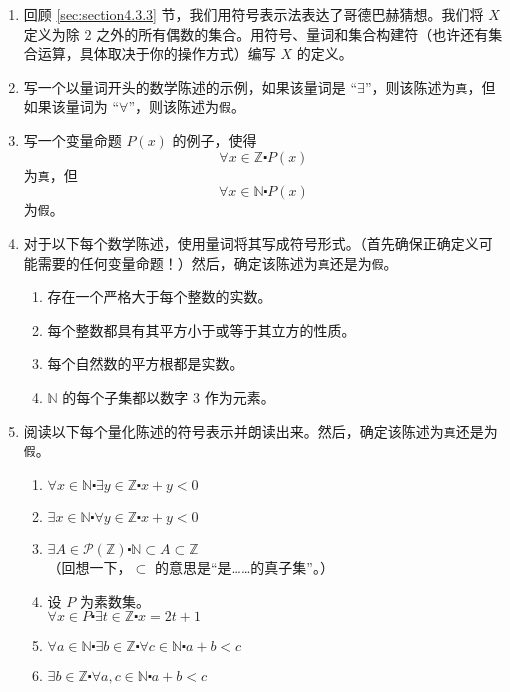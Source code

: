 \begin{enumerate}[label=(\arabic*)]
    \item 回顾 \ref{sec:section4.3.3} 节，我们用符号表示法表达了哥德巴赫猜想。我们将 $X$ 定义为除 $2$ 之外的所有偶数的集合。用符号、量词和集合构建符（也许还有集合运算，具体取决于你的操作方式）编写 $X$ 的定义。
    \item 写一个以量词开头的数学陈述的示例，如果该量词是 ``$\exists$''，则该陈述为\verb|真|，但如果该量词为  ``$\forall$''，则该陈述为\verb|假|。
    \item 写一个变量命题 $P(x)$ 的例子，使得
        \[\forall x \in \mathbb{Z} \centerdot P(x)\]
        为\verb|真|，但
        \[\forall x \in \mathbb{N} \centerdot P(x)\]
        为\verb|假|。
    \item 对于以下每个数学陈述，使用量词将其写成符号形式。（首先确保正确定义可能需要的任何变量命题！）然后，确定该陈述为\verb|真|还是为\verb|假|。
        \begin{enumerate}[label=(\alph*)]
            \item 存在一个严格大于每个整数的实数。
            \item 每个整数都具有其平方小于或等于其立方的性质。
            \item 每个自然数的平方根都是实数。
            \item $\mathbb{N}$ 的每个子集都以数字 $3$ 作为元素。
        \end{enumerate} 
    \item 阅读以下每个量化陈述的符号表示并朗读出来。然后，确定该陈述为\verb|真|还是为\verb|假|。
        \begin{enumerate}[label=(\alph*)]
            \item $\forall x \in \mathbb{N} \centerdot \exists y \in \mathbb{Z} \centerdot x + y < 0$
            \item $\exists x \in \mathbb{N} \centerdot \forall y \in \mathbb{Z} \centerdot x + y < 0$
            \item $\exists A \in \mathcal{P}(\mathbb{Z}) \centerdot \mathbb{N} \subset A \subset \mathbb{Z}$\\（回想一下，$⊂$ 的意思是``是……的真子集''。）
            \item 设 $P$ 为素数集。\\
                    $\forall x \in P \centerdot \exists t \in \mathbb{Z} \centerdot x = 2t + 1$
            \item $\forall a \in \mathbb{N} \centerdot \exists b \in \mathbb{Z} \centerdot \forall c \in \mathbb{N} \centerdot a + b < c$
            \item $\exists b \in \mathbb{Z} \centerdot \forall a, c \in \mathbb{N} \centerdot a + b < c$
        \end{enumerate} 
\end{enumerate}   